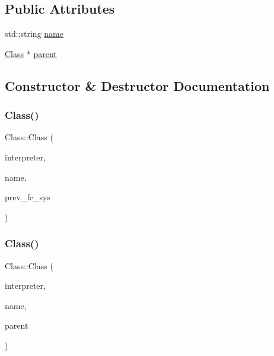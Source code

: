 \subsection*{Public Attributes}
\begin{DoxyCompactItemize}
\item 
std\+::string \hyperlink{classClass_aac209ee2e03afc3bc9e93fd1fd46256b}{name}
\item 
\hyperlink{classClass}{Class} $\ast$ \hyperlink{classClass_a1f94bc39c04d18b5c4421862f8506d1d}{parent}
\end{DoxyCompactItemize}


\subsection{Constructor \& Destructor Documentation}
\mbox{\label{classClass_a7682a59beaae0b8ce1070af8b9dcb534}} 
\subsubsection{\texorpdfstring{Class()}{Class()}\hspace{0.1cm}{\footnotesize\ttfamily [1/2]}}
{\footnotesize\ttfamily Class\+::\+Class (\begin{DoxyParamCaption}\item[{\hyperlink{classInterpreter}{Interpreter} $\ast$}]{interpreter,  }\item[{std\+::string}]{name,  }\item[{\hyperlink{classFunctionSystem}{Function\+System} $\ast$}]{prev\+\_\+fc\+\_\+sys }\end{DoxyParamCaption})}

\mbox{\label{classClass_a56aabf11831a180f94fe047d4af4ccb5}} 
\subsubsection{\texorpdfstring{Class()}{Class()}\hspace{0.1cm}{\footnotesize\ttfamily [2/2]}}
{\footnotesize\ttfamily Class\+::\+Class (\begin{DoxyParamCaption}\item[{\hyperlink{classInterpreter}{Interpreter} $\ast$}]{interpreter,  }\item[{std\+::string}]{name,  }\item[{\hyperlink{classClass}{Class} $\ast$}]{parent }\end{DoxyParamCaption})}

